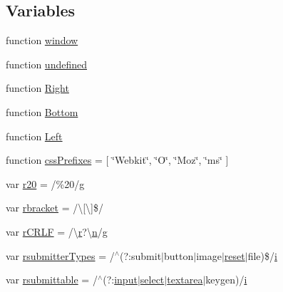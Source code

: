 \subsection*{Variables}
\begin{DoxyCompactItemize}
\item 
function \hyperlink{jquery-1_89_81_8js_a04a8a2bbfa9c15500892b8e5033d625b}{window}
\item 
function \hyperlink{jquery-1_89_81_8js_a08113a236cc18d2a9d5ce27e638012be}{undefined}
\item 
function \hyperlink{jquery-1_89_81_8js_ac7f66efc33d974809d85fc5bdb00c6eb}{Right}
\item 
function \hyperlink{jquery-1_89_81_8js_aff76c1cba4a00c678dfce0e0c5a5538a}{Bottom}
\item 
function \hyperlink{jquery-1_89_81_8js_abef68bf244a1159a49fe3a2c153a65d2}{Left}
\item 
function \hyperlink{jquery-1_89_81_8js_a2ed3892172b336458b8074254f4471da}{css\+Prefixes} = \mbox{[} \char`\"{}Webkit\char`\"{}, \char`\"{}O\char`\"{}, \char`\"{}Moz\char`\"{}, \char`\"{}ms\char`\"{} \mbox{]}
\item 
var \hyperlink{jquery-1_89_81_8js_a0e39f72d512af99fb5992d66f1a1c821}{r20} = /\%20/\hyperlink{fullpage_2plugin_8min_8js_a103df269476e78897c9c4c6cb8f4eb06}{g}
\item 
var \hyperlink{jquery-1_89_81_8js_a07117e28ee58d2d2664cfbaf741e10c1}{rbracket} = /\textbackslash{}\mbox{[}\textbackslash{}\mbox{]}\$/
\item 
var \hyperlink{jquery-1_89_81_8js_a4fd9dfc4eb645b441a3e84730c50154b}{r\+C\+R\+L\+F} = /\textbackslash{}\hyperlink{jquery_8fancybox_8pack_8js_aaa5fef39529cdffdfa257202bb4fda9f}{r}?\textbackslash{}\hyperlink{fullpage_2plugin_8min_8js_ab767a859d1217315f42c9bb52fc648dc}{n}/\hyperlink{fullpage_2plugin_8min_8js_a103df269476e78897c9c4c6cb8f4eb06}{g}
\item 
var \hyperlink{jquery-1_89_81_8js_a0e9cd4ca08945afe827846f34a36c74a}{rsubmitter\+Types} = /$^\wedge$(?\+:submit$\vert$button$\vert$image$\vert$\hyperlink{validate_8js_a274ff3771165439be9e3e6e7d79dfefe}{reset}$\vert$file)\$/\hyperlink{validate_8js_a5e25b1d1bed9ab5f3174b76d6a722180}{i}
\item 
var \hyperlink{jquery-1_89_81_8js_a12d248d7e6c5985c5ea21f56fbef9e90}{rsubmittable} = /$^\wedge$(?\+:\hyperlink{validate_8js_a07a2aabd64594dc36dd810cad2669deb}{input}$\vert$\hyperlink{validate_8js_a107b4864f70df98ef4a521c0b2bc80c7}{select}$\vert$\hyperlink{validate_8js_a7238bc4fc70c702e90c5c654ff465b8d}{textarea}$\vert$keygen)/\hyperlink{validate_8js_a5e25b1d1bed9ab5f3174b76d6a722180}{i}

\end{DoxyCompactItemize}
